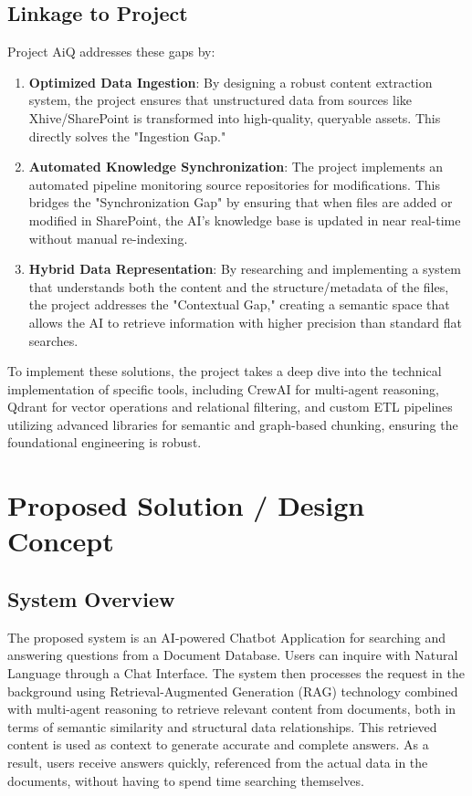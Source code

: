 \documentclass[12pt]{article}
\begin{document}
\subsection{Linkage to Project}
Project AiQ addresses these gaps by:
\begin{enumerate}
    \item \textbf{Optimized Data Ingestion}: By designing a robust content extraction system, the project ensures that unstructured data from sources like Xhive/SharePoint is transformed into high-quality, queryable assets. This directly solves the "Ingestion Gap."
    \item \textbf{Automated Knowledge Synchronization}: The project implements an automated pipeline monitoring source repositories for modifications. This bridges the "Synchronization Gap" by ensuring that when files are added or modified in SharePoint, the AI's knowledge base is updated in near real-time without manual re-indexing.
    \item \textbf{Hybrid Data Representation}: By researching and implementing a system that understands both the content and the structure/metadata of the files, the project addresses the "Contextual Gap," creating a semantic space that allows the AI to retrieve information with higher precision than standard flat searches.
\end{enumerate}

To implement these solutions, the project takes a deep dive into the technical implementation of specific tools, including CrewAI for multi-agent reasoning, Qdrant for vector operations and relational filtering, and custom ETL pipelines utilizing advanced libraries for semantic and graph-based chunking, ensuring the foundational engineering is robust.

\newpage
\section{Proposed Solution / Design Concept}

\subsection{System Overview}
The proposed system is an AI-powered Chatbot Application for searching and answering questions from a Document Database. Users can inquire with Natural Language through a Chat Interface. The system then processes the request in the background using Retrieval-Augmented Generation (RAG) technology combined with multi-agent reasoning to retrieve relevant content from documents, both in terms of semantic similarity and structural data relationships. This retrieved content is used as context to generate accurate and complete answers. As a result, users receive answers quickly, referenced from the actual data in the documents, without having to spend time searching themselves.
\end{document}
